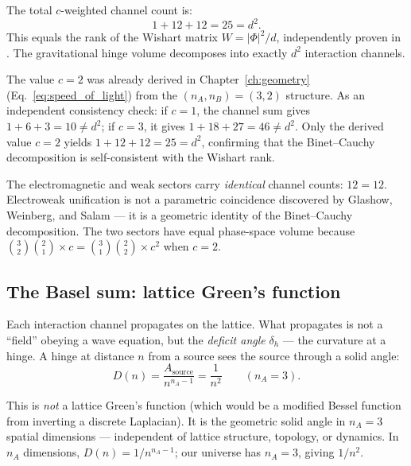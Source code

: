 \bigskip

\begin{theorem}
\label{thm:25}
The total $c$-weighted channel count is:
\begin{equation}
\boxed{1 + 12 + 12 = 25 = d^2.}
\end{equation}
This equals the rank of the Wishart matrix $W = |\Phi|^2/d$, independently proven in \cite{Wishart}. The gravitational hinge volume decomposes into exactly $d^2$ interaction channels.
\end{theorem}

\begin{remark}[Self-consistency check: $c = 2$]
The value $c = 2$ was already derived in Chapter~\ref{ch:geometry} (Eq.~\ref{eq:speed_of_light}) from the $(n_A, n_B) = (3, 2)$ structure. As an independent consistency check: if $c = 1$, the channel sum gives $1 + 6 + 3 = 10 \neq d^2$; if $c = 3$, it gives $1 + 18 + 27 = 46 \neq d^2$. Only the derived value $c = 2$ yields $1 + 12 + 12 = 25 = d^2$, confirming that the Binet--Cauchy decomposition is self-consistent with the Wishart rank.
\end{remark}

\begin{remark}
The electromagnetic and weak sectors carry \emph{identical} channel counts: $12 = 12$. Electroweak unification is not a parametric coincidence discovered by Glashow, Weinberg, and Salam --- it is a geometric identity of the Binet--Cauchy decomposition. The two sectors have equal phase-space volume because $\binom{3}{2}\binom{2}{1} \times c = \binom{3}{1}\binom{2}{2} \times c^2$ when $c = 2$.
\end{remark}

\subsection{The Basel sum: lattice Green's function}

Each interaction channel propagates on the lattice. What propagates is not a ``field'' obeying a wave equation, but the \emph{deficit angle} $\delta_h$ --- the curvature at a hinge. A hinge at distance $n$ from a source sees the source through a solid angle:
\begin{equation}
D(n) = \frac{A_\text{source}}{n^{n_A - 1}} = \frac{1}{n^2} \qquad (n_A = 3).
\end{equation}

This is \emph{not} a lattice Green's function (which would be a modified Bessel function from inverting a discrete Laplacian). It is the geometric solid angle in $n_A = 3$ spatial dimensions --- independent of lattice structure, topology, or dynamics. In $n_A$ dimensions, $D(n) = 1/n^{n_A-1}$; our universe has $n_A = 3$, giving $1/n^2$.

